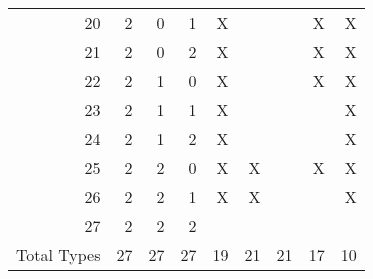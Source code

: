 \documentclass[11pt,notitlepage]{article}\usepackage[]{graphicx}\usepackage[]{color}
\begin{document}
\begin{table}[H]
\begin{tabular}{rrrrrrrrr}
    20    & 2     & 0     & 1     & X     &       &       & X     & X \\
    21    & 2     & 0     & 2     & X     &       &       & X     & X \\
    22    & 2     & 1     & 0     & X     &       &       & X     & X \\
    23    & 2     & 1     & 1     & X     &       &       &       & X \\
    24    & 2     & 1     & 2     & X     &       &       &       & X \\
    25    & 2     & 2     & 0     & X     & X      &       & X     & X \\
    26    & 2     & 2     & 1     & X     & X      &       &       & X \\
    27    & 2     & 2     & 2     &       &       &       &       &  \\ \hline
    Total Types & 27    & 27    & 27    & 19    & 21    & 21    & 17    & 10 \\
    \bottomrule
    \end{tabular}%
\end{table}%
\end{document}
